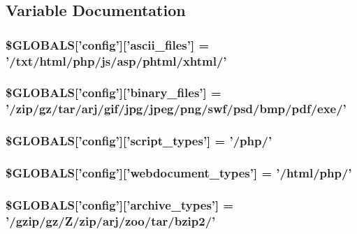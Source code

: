 \subsection{Variable Documentation}
\hypertarget{config_8php_feeb257c3edcf45093f5ffaccc3b8ee0}{
\subsubsection{\setlength{\rightskip}{0pt plus 5cm}\$GLOBALS\mbox{[}'config'\mbox{]}\mbox{[}'ascii\_\-files'\mbox{]} = '/txt/html/php/js/asp/phtml/xhtml/'}}
\label{config_8php_feeb257c3edcf45093f5ffaccc3b8ee0}


\hypertarget{config_8php_0192eb81e0d90debab674415130b0884}{
\subsubsection{\setlength{\rightskip}{0pt plus 5cm}\$GLOBALS\mbox{[}'config'\mbox{]}\mbox{[}'binary\_\-files'\mbox{]} = '/zip/gz/tar/arj/gif/jpg/jpeg/png/swf/psd/bmp/pdf/exe/'}}
\label{config_8php_0192eb81e0d90debab674415130b0884}


\hypertarget{config_8php_c4d548310cf87788e37150caed7d4092}{
\subsubsection{\setlength{\rightskip}{0pt plus 5cm}\$GLOBALS\mbox{[}'config'\mbox{]}\mbox{[}'script\_\-types'\mbox{]} = '/php/'}}
\label{config_8php_c4d548310cf87788e37150caed7d4092}


\hypertarget{config_8php_bf54039b81f6214bcc39d4f399ad068f}{
\subsubsection{\setlength{\rightskip}{0pt plus 5cm}\$GLOBALS\mbox{[}'config'\mbox{]}\mbox{[}'webdocument\_\-types'\mbox{]} = '/html/php/'}}
\label{config_8php_bf54039b81f6214bcc39d4f399ad068f}


\hypertarget{config_8php_93b1c5faba6a6e120b07b4206a619144}{
\subsubsection{\setlength{\rightskip}{0pt plus 5cm}\$GLOBALS\mbox{[}'config'\mbox{]}\mbox{[}'archive\_\-types'\mbox{]} = '/gzip/gz/Z/zip/arj/zoo/tar/bzip2/'}}
\label{config_8php_93b1c5faba6a6e120b07b4206a619144}


